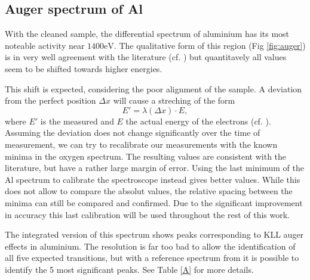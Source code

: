 \documentclass[a4paper]{scrartcl}
\numberwithin{equation}{section}
\numberwithin{figure}{section}
\numberwithin{table}{section}
\newcommand{\eq}[2]{\begin{equation}#1\label{#2}\end{equation}}
\begin{document}
\subsection{Auger spectrum of Al}
With the cleaned sample, the differential spectrum of aluminium has its most noteable activity near $1400\text{eV}$. The qualitative form of this region (Fig \ref{fig:auger}) is in very well agreement with the literature (cf. \cite{handbook}) but quantitavely all values seem to be shifted towards higher energies.

This shift is expected, considering the poor alignment of the sample. A deviation from the perfect position $\Delta x$ will cause a streching of the form
\eq{E' = \lambda (\Delta x) \cdot E,}{}
where $E'$ is the measured and $E$ the actual energy of the electrons (cf. \cite{zangwill}). Assuming the deviation does not change significantly over the time of measurement, we can try to recalibrate our measurements with the known minima in the oxygen spectrum.
The resulting values are consistent with the literature, but have a rather large margin of error. Using the last minimum of the Al spectrum to calibrate the spectroscope instead gives better values. While this does not allow to compare the absolut values, the relative spacing between the minima can still be compared and confirmed. Due to the significant improvement in accuracy this last calibration will be used throughout the rest of this work.



The integrated version of this spectrum shows peaks corresponding to KLL auger effects in aluminium. The resolution is far too bad to allow the identification of all five expected transitions, but with a reference spectrum from \cite{paper} it is possible to identify the 5 most significant peaks. See Table \ref{A} for more details.
\end{document}

